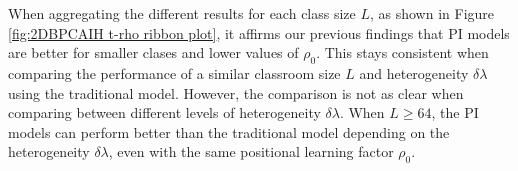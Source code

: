 When aggregating the different results for each class size $L$, as shown in Figure \ref{fig:2DBPCAIH t-rho ribbon plot}, it affirms our previous findings that PI models are better for smaller clases and lower values of $\rho_0$.
This stays consistent when comparing the performance of a similar classroom size $L$ and heterogeneity $\delta\lambda$ using the traditional model.
However, the comparison is not as clear when comparing between different levels of heterogeneity $\delta\lambda$.
When $L\geq64$, the PI models can perform better than the traditional model depending on the heterogeneity $\delta\lambda$, even with the same positional learning factor $\rho_0$.

\begin{figure}[htbp!]
    \centering

\end{figure}
